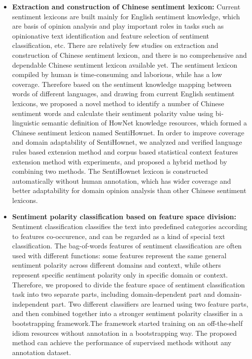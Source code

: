 \begin{eabstract}
\begin{itemize}
\item \textbf{Extraction and construction of Chinese sentiment lexicon:} Current sentiment lexicons are built mainly for English sentiment knowledge, which are basis of opinion analysis and play important roles in tasks such as opinionative text identification and feature selection of sentiment classification, etc. There are relatively few studies on extraction and construction of Chinese sentiment lexicon, and there is no comprehensive and dependable Chinese sentiment lexicon available yet. The sentiment lexicon compiled by human is time-consuming and laborious, while has a low coverage. Therefore based on the sentiment knowledge mapping between words of different languages, and drawing from current English sentiment lexicons, we proposed a novel method to identify a number of Chinese sentiment words and calculate their sentiment polarity value using bi-linguistic semantic definition of HowNet knowledge resources, which formed a Chinese sentiment lexicon named SentiHownet. In order to improve coverage and domain adaptability of SentiHownet, we analyzed and verified language rules based extension method and corpus based statistical context features extension method with experiments, and proposed a hybrid method by combining two methods. The SentiHownet lexicon is constructed automatically without human annotation, which has wider coverage and better adaptability for domain opinion analysis than other Chinese sentiment lexicons.
\item \textbf{Sentiment polarity classification based on feature space division:} Sentiment classification classifies the text into predefined categories according to features co-occurence, and can be regarded as a kind of special text classification. The bag-of-words features of sentiment classification are often used with different functions: some features represent the same general sentiment polarity across different domains and context, while others represent specific sentiment polarity only in specific domain or context. Therefore, we proposed to divide the feature space of sentiment classification task into two separate parts, including domain-dependent part and domain-independent part. Two different classifiers are learned using two feature parts, and then combined together into a stronger sentiment polarity classifier in a bootstrapping framework.The framework started training on an off-the-shelf idiom resources without annotation in a bootstrapping way. The proposed method can achieve the performance of supervised methods without any annotation dataset.

\end{itemize}
\end{eabstract}
